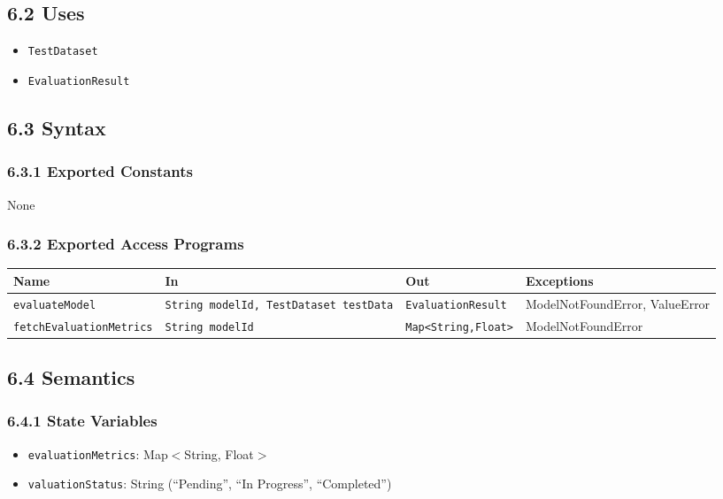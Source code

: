 \documentclass[12pt, titlepage]{article}
\begin{document}
\subsection{6.2 Uses}
\begin{itemize}
    \item \texttt{TestDataset}
    \item \texttt{EvaluationResult}
\end{itemize}

\subsection{6.3 Syntax}

\subsubsection{6.3.1 Exported Constants}
None

\subsubsection{6.3.2 Exported Access Programs}
\begin{center}
\begin{tabular}{p{3.5cm} p{4.5cm} p{4cm} p{3cm}}
\hline
\textbf{Name} & \textbf{In} & \textbf{Out} & \textbf{Exceptions} \\
\hline
\texttt{evaluateModel} & \texttt{String modelId, TestDataset testData} & \texttt{EvaluationResult} & ModelNotFoundError, ValueError \\
\hline
\texttt{fetchEvaluationMetrics} & \texttt{String modelId} & \texttt{Map<String,Float>} & ModelNotFoundError \\
\hline
\end{tabular}
\end{center}

\subsection{6.4 Semantics}

\subsubsection{6.4.1 State Variables}
\begin{itemize}
    \item \texttt{evaluationMetrics}: Map$<$String, Float$>$
    \item \texttt{valuationStatus}: String (``Pending'', ``In Progress'', ``Completed'')
\end{itemize}
\end{document}
